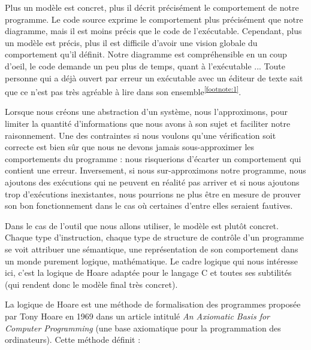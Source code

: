 Plus un modèle est concret, plus il décrit précisément le comportement de notre
programme. Le code source exprime le comportement plus précisément que notre 
diagramme, mais il est moins précis que le code de l'exécutable. Cependant, plus
un modèle est précis, plus il est difficile d'avoir une vision globale du 
comportement qu'il définit. Notre diagramme est compréhensible en un coup d'oeil,
le code demande un peu plus de temps, quant à l'exécutable ... Toute personne qui
a déjà ouvert par erreur un exécutable avec un éditeur de texte sait que ce n'est
pas très agréable à lire dans son ensemble\textsuperscript{\ref{footnote:1}}.



Lorsque nous créons une abstraction d'un système, nous l'approximons, pour limiter
la quantité d'informations que nous avons à son sujet et faciliter notre 
raisonnement. Une des contraintes si nous voulons qu'une vérification soit 
correcte est bien sûr que nous ne devons jamais sous-approximer les comportements 
du programme : nous risquerions d'écarter un comportement qui contient une erreur.
Inversement, si nous sur-approximons notre programme, nous ajoutons des exécutions
qui ne peuvent en réalité pas arriver et si nous ajoutons trop d'exécutions 
inexistantes, nous pourrions ne plus être en mesure de prouver son bon 
fonctionnement dans le cas où certaines d'entre elles seraient fautives.



Dans le cas de l'outil que nous allons utiliser, le modèle est plutôt concret. 
Chaque type d'instruction, chaque type de structure de contrôle d'un programme 
se voit attribuer une sémantique, une représentation de son comportement dans 
un monde purement logique, mathématique. Le cadre logique qui nous intéresse 
ici, c'est la logique de Hoare adaptée pour le langage C et toutes ses 
subtilités (qui rendent donc le modèle final très concret).








La logique de Hoare est une méthode de formalisation des programmes proposée 
par Tony Hoare en 1969 dans un article intitulé \textit{An Axiomatic Basis for 
Computer Programming} (une base axiomatique pour la programmation des 
ordinateurs). Cette méthode définit :



